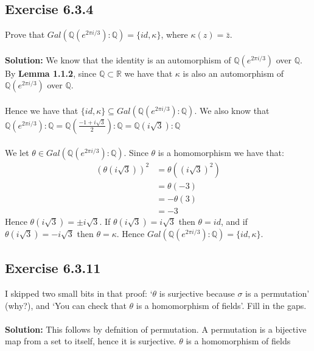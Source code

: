 \documentclass{article}
\begin{document}
\subsection*{Exercise 6.3.4}
Prove that $Gal(\mathbb{Q}(e^{2\pi i /3}):\mathbb{Q}) = \{ id, \kappa\}$, where $\kappa(z)=\bar z$.
\\\\
\textbf{Solution:}
We know that the identity is an automorphism of $\mathbb{Q}(e^{2\pi i /3})$ over $\mathbb{Q}$. 
By \textbf{Lemma 1.1.2}, since $\mathbb{Q} \subset \mathbb{R}$ we have that $\kappa$ is also an automorphism of $\mathbb{Q}(e^{2\pi i /3})$ over $\mathbb{Q}$.
\\\\
Hence we have that $\{ id, \kappa\} \subseteq Gal(\mathbb{Q}(e^{2\pi i /3}):\mathbb{Q})$.
We also know that $\mathbb{Q}(e^{2\pi i /3}):\mathbb{Q} = \mathbb{Q}(\frac{-1+i\sqrt{3}}{2}):\mathbb{Q}=  \mathbb{Q}(i\sqrt{3}):\mathbb{Q}$
\\\\
We let $\theta \in Gal(\mathbb{Q}(e^{2\pi i /3}):\mathbb{Q})$. Since $\theta$ is a homomorphism we have that:
\begin{equation*}
    \begin{aligned}
        (\theta(i\sqrt{3}))^2 &= \theta((i\sqrt{3})^2)\\
        &= \theta(-3)\\
        &= -\theta(3)\\
        &= -3
    \end{aligned}
\end{equation*}
Hence $\theta(i \sqrt{3}) = \pm i\sqrt{3}$. If $\theta(i\sqrt{3}) = i\sqrt{3}$ then $\theta = id$,
and if $\theta(i\sqrt{3}) = -i\sqrt{3}$ then $\theta=\kappa$. Hence $Gal(\mathbb{Q}(e^{2\pi i /3}):\mathbb{Q}) = \{id, \kappa\}$.

\subsection*{Exercise 6.3.11}
I skipped two small bits in that proof: `$\theta$ is surjective because $\sigma$ is a permutation' (why?), and
`You can check that $\theta$ is a homomorphism of fields'. Fill in the gaps.
\\\\
\textbf{Solution:}
This follows by defnition of permutation. A permutation is a bijective map from a set to itself, hence it is surjective.
$\theta$ is a homomorphism of fields
\end{document}
